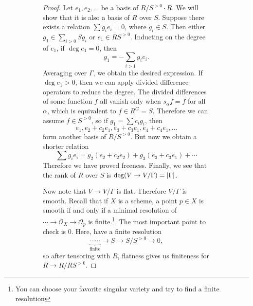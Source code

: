 \documentclass[leqno, openany]{memoir}
\theoremstyle{definition}
\theoremstyle{remark}
\theoremstyle{plain}
\theoremstyle{definition}
\theoremstyle{remark}
\newcommand{\mc}[1]{\mathcal{#1}}
\begin{document}
\begin{figure}[H]
\begin{figure}[H]
\begin{proof} Let $e_1, e_2, \ldots$ be a basis of $R/S^{>0} \cdot R$. We will
    show that it is also a basis of $R$ over $S$. Suppose there exists a
    relation $\sum g_i e_i = 0$, where $g_i \in S$. Then either $g_1 \in
    \sum_{i > 0} S g_i$ or $e_1 \in RS^{>0}$. Inducting on the degree of $e_1$,
    if $\deg e_1 = 0$, then \[ g_1 = - \sum_{i > 1} g_i e_i. \] Averaging over
    $\Gamma$, we obtain the desired expression. If $\deg e_1 > 0$, then we can
    apply divided difference operators to reduce the degree. The divided
    differences of some function $f$ all vanish only when $s_{\alpha} f = f$
    for all $\alpha$, which is equivalent to $f \in R^G = S$. Therefore we can
    assume $f \in S^{>0}$, so if $g_1 = \sum c_i g_i$, then \[ e_1, e_2 + c_2
        e_1, e_3 + c_3 e_1, e_4 + c_4 e_1, \ldots \] form another basis of
        $R/S^{>0}$. But now we obtain a shorter relation \[ \sum g_i e_i = g_2
        (e_2 + c_2 e_2) + g_3(e_3 + c_3 e_1) + \cdots \] Therefore we have
        proved freeness. Finally, we see that the rank of $R$ over $S$ is $\deg
        (V \to V/\Gamma) = \abs{\Gamma}$.

    Now note that $V \to V/\Gamma$ is flat. Therefore $V/\Gamma$ is smooth.
    Recall that if $X$ is a scheme, a point $p \in X$ is smooth if and only if
    a minimal resolution of $\cdots \to \mc{O}_X \to \mc{O}_p$ is
    finite.\footnote{You can choose your favorite singular variety and try to
    find a finite resolution}. The most important point to check is $0$. Here,
    have a finite resolution \[ \underbrace{\cdots \cdots}_{\text{finite}} \to
    S \to S/S^{>0} \to 0, \] so after tensoring with $R$, flatness gives us
    finiteness for $R \to R/RS^{>0}$.


\end{proof}
\end{figure}
\end{figure}
\end{document}
